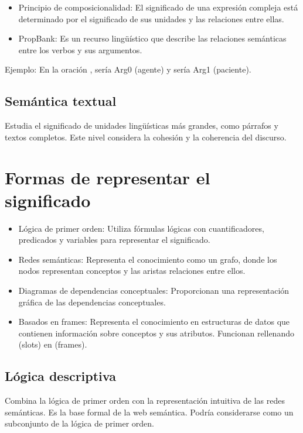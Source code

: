 \documentclass{report}
\begin{document}
\begin{itemize}
    \item Principio de composicionalidad: El significado de una expresión compleja está determinado por el significado de sus unidades y las relaciones entre ellas.
    \item PropBank: Es un recurso lingüístico que describe las relaciones semánticas entre los verbos y sus argumentos.
\end{itemize}

Ejemplo: En la oración ,  sería Arg0 (agente) y  sería Arg1 (paciente).

\subsection{Semántica textual}
Estudia el significado de unidades lingüísticas más grandes, como párrafos y textos completos. Este nivel considera la cohesión y la coherencia del discurso.

\section{Formas de representar el significado}
\begin{itemize}
    \item {Lógica de primer orden:}
        Utiliza fórmulas lógicas con cuantificadores, predicados y variables para representar el significado.
    \item{Redes semánticas:}
        Representa el conocimiento como un grafo, donde los nodos representan conceptos y las aristas relaciones entre ellos.
    \item {Diagramas de dependencias conceptuales: }
        Proporcionan una representación gráfica de las dependencias conceptuales\autocite{SCHANK1972552}.
    \item {Basados en frames:}
        Representa el conocimiento en estructuras de datos que contienen información sobre conceptos y sus atributos.
        Funcionan rellenando  (slots) en  (frames)\autocite{Fillmore1985FramesAT}.
\end{itemize}
\subsection{Lógica descriptiva}
Combina la lógica de primer orden con la representación intuitiva de las redes semánticas. Es la base formal de la web semántica. Podría considerarse como un subconjunto de la lógica de primer orden.
\end{document}
